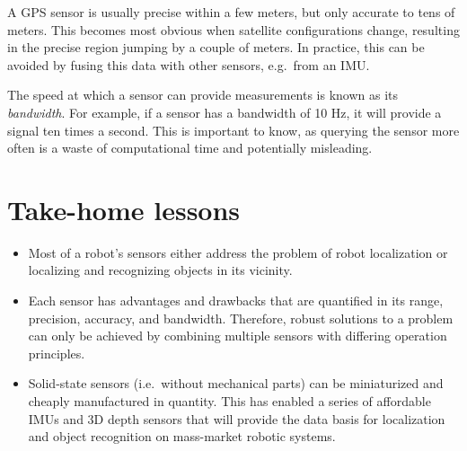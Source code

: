 A GPS sensor is usually precise within a few meters, but only accurate to tens of meters. This becomes most obvious when satellite configurations change, resulting in the precise region jumping by a couple of meters. In practice, this can be avoided by fusing this data with other sensors, e.g.\ from an IMU.

The speed at which a sensor can provide measurements is known as its  \emph{bandwidth}. For example, if a sensor has a bandwidth of 10 Hz, it will provide a signal ten times a second. This is important to know, as querying the sensor more often is a waste of computational time and potentially misleading.


\section*{Take-home lessons}
\begin{itemize}
\item Most of a robot's sensors either address the problem of robot localization or localizing and recognizing objects in its vicinity.
\item Each sensor has advantages and drawbacks that are quantified in its range, precision, accuracy, and bandwidth. Therefore, robust solutions to a problem can only be achieved by combining multiple sensors with differing operation principles.
\item Solid-state sensors (i.e.\ without mechanical parts) can be miniaturized and cheaply manufactured in quantity. This has enabled a series of affordable IMUs and 3D depth sensors that will provide the data basis for localization and object recognition on mass-market robotic systems.
\end{itemize}

